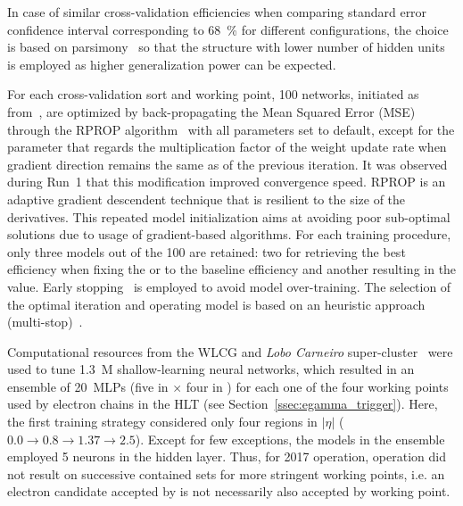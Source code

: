 In case of similar cross-validation efficiencies when comparing standard
error confidence interval corresponding to \SI{68}{\%} for different
configurations, the choice is based on
parsimony~\cite{haykin_2008, medeiros2001statistical} so that the structure with lower number of hidden units
is employed as higher generalization power can be expected. 






For each cross-validation sort and working point, 100 networks, initiated
as from~\cite{initnw}, are optimized by back-propagating the Mean Squared Error (MSE) through the RPROP
algorithm~\cite{rprop} with all parameters set to default,
except for the parameter that regards the multiplication factor of the weight update rate when gradient direction remains the same as of the previous iteration. It was 
observed during Run~1 that this modification improved convergence speed. RPROP
is an adaptive gradient descendent technique that is resilient to the size of
the derivatives. This repeated model initialization aims at
avoiding poor sub-optimal solutions due to usage of gradient-based algorithms.
For each training procedure, only three models out of the 100 are retained: two
for retrieving the best efficiency when fixing the \pd{} or \pf{} to the
baseline \fastcalo{} efficiency and another resulting in the \spmax{} value.
Early stopping~\cite{haykin_2008} is employed to avoid model over-training. The
selection of the optimal iteration and operating model is based on an heuristic approach (multi-stop)~\cite{Goodfellow2016}.


Computational resources from the WLCG and \emph{Lobo Carneiro}
super-cluster~\cite{lobo_carneiro} were used to tune 1.3~M shallow-learning
neural networks, which resulted in an ensemble of \SI{20}{MLPs} (five in \et{}
$\times$ four in \abseta{}) for each one of the four working points used by
electron chains in the HLT (see Section~\ref{ssec:egamma_trigger}).
Here, the first training strategy considered only four regions in $|\eta|$ ($0.0\rightarrow 0.8\rightarrow1.37\rightarrow2.5$).
Except for few exceptions, the models in the ensemble employed 5 neurons in the 
hidden layer.  Thus, for 2017 operation, 
\rnn{} operation did not result on
successive contained sets for more stringent working points, i.e. an electron
candidate accepted by \medium{} is not necessarily also accepted by \loose{}
working point. %


